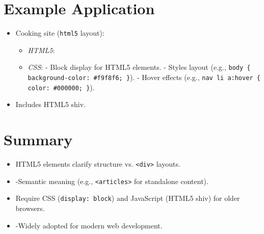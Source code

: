 \documentclass[a4paper,11pt]{article}
\begin{document}
\section{Example Application}
\begin{itemize}
    \item Cooking site (\texttt{html5} layout):
    \begin{itemize}
        \item \emph{HTML5}:
        \item \emph{CSS}:
            - Block display for HTML5 elements.
            - Styles layout (e.g., \texttt{body \{ background-color: \#f9f8f6; \}}).
            - Hover effects (e.g., \texttt{nav li a:hover \{ color: \#000000; \}}).
    \end{itemize}
    \item Includes HTML5 shiv.
\end{itemize}

\section{Summary}
\begin{itemize}
    \item HTML5 elements clarify structure vs. \texttt{<div>} layouts.
    \item-Semantic meaning (e.g., \texttt{<articles>} for standalone content).
    \item Require CSS (\texttt{display: block}) and JavaScript (HTML5 shiv) for older browsers.
    \item-Widely adopted for modern web development.
\end{itemize}
\end{document}
